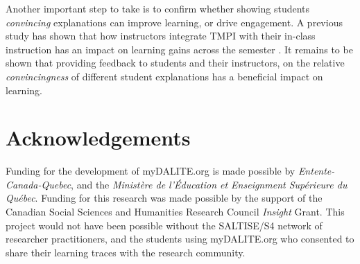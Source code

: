 \documentclass[notitlepage,12pt]{jedm}
\begin{document}
Another important step to take is to confirm whether showing students 
\textit{convincing} explanations can improve learning, or drive engagement. 
A previous study has shown that how instructors integrate TMPI with their 
in-class instruction has an impact on learning gains across the semester 
\cite{bhatnagar_analysis_2015}. 
It remains to be shown that providing feedback to students and their 
instructors, on the relative \textit{convincingness} of different student 
explanations has a beneficial impact on learning.




\section{Acknowledgements}
Funding for the development of myDALITE.org is made possible by 
\textit{Entente-Canada-Quebec}, and the \textit{Ministère de l'Éducation et 
Enseignment Supérieure du Québec}. Funding for this research was made possible 
by the support of the Canadian Social Sciences and Humanities Research Council 
\textit{Insight} Grant. This project would not have been possible without the 
SALTISE/S4 network of researcher practitioners, and the students using 
myDALITE.org who consented to share their learning traces with the research 
community.

 




\end{document}
